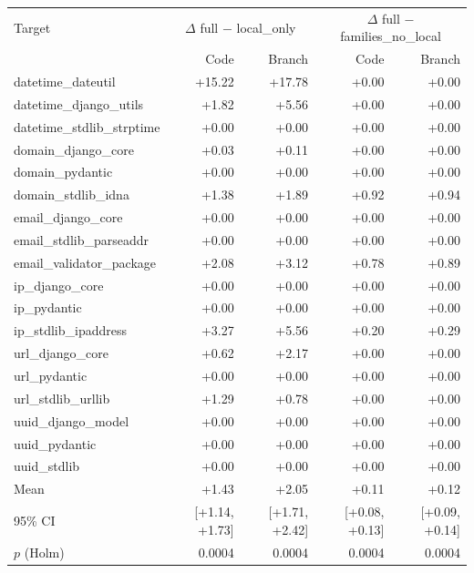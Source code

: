 \begin{tabular}{lrrrr}
\toprule
Target & \multicolumn{2}{c}{$\Delta$ full $-$ local\_only} & \multicolumn{2}{c}{$\Delta$ full $-$ families\_no\_local} \\
 & Code & Branch & Code & Branch \\
\midrule
datetime\_dateutil & +15.22 & +17.78 & +0.00 & +0.00 \\
datetime\_django\_utils & +1.82 & +5.56 & +0.00 & +0.00 \\
datetime\_stdlib\_strptime & +0.00 & +0.00 & +0.00 & +0.00 \\
domain\_django\_core & +0.03 & +0.11 & +0.00 & +0.00 \\
domain\_pydantic & +0.00 & +0.00 & +0.00 & +0.00 \\
domain\_stdlib\_idna & +1.38 & +1.89 & +0.92 & +0.94 \\
email\_django\_core & +0.00 & +0.00 & +0.00 & +0.00 \\
email\_stdlib\_parseaddr & +0.00 & +0.00 & +0.00 & +0.00 \\
email\_validator\_package & +2.08 & +3.12 & +0.78 & +0.89 \\
ip\_django\_core & +0.00 & +0.00 & +0.00 & +0.00 \\
ip\_pydantic & +0.00 & +0.00 & +0.00 & +0.00 \\
ip\_stdlib\_ipaddress & +3.27 & +5.56 & +0.20 & +0.29 \\
url\_django\_core & +0.62 & +2.17 & +0.00 & +0.00 \\
url\_pydantic & +0.00 & +0.00 & +0.00 & +0.00 \\
url\_stdlib\_urllib & +1.29 & +0.78 & +0.00 & +0.00 \\
uuid\_django\_model & +0.00 & +0.00 & +0.00 & +0.00 \\
uuid\_pydantic & +0.00 & +0.00 & +0.00 & +0.00 \\
uuid\_stdlib & +0.00 & +0.00 & +0.00 & +0.00 \\
\midrule
Mean & +1.43 & +2.05 & +0.11 & +0.12 \\
95\% CI & [+1.14, +1.73] & [+1.71, +2.42] & [+0.08, +0.13] & [+0.09, +0.14] \\
$p$ (Holm) & 0.0004 & 0.0004 & 0.0004 & 0.0004 \\
\bottomrule
\end{tabular}
